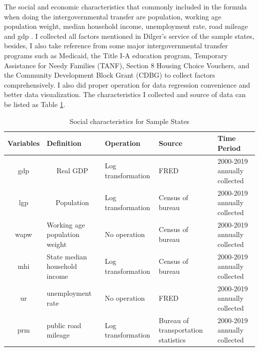 The social and economic characteristics that commonly included in the formula when doing the intergovernmental transfer are population, working age population weight, median household income, unemployment rate, road mileage and gdp \cite{dilger2015federal}. I collected all factors mentioned in Dilger's service\cite{dilger2015federal} of the sample states, besides, I also take reference from some major intergovernmental transfer programs such as Medicaid, the Title I-A education program, Temporary Assistance for Needy Families (TANF), Section 8 Housing Choice Vouchers, and the Community Development Block Grant (CDBG) to collect factors comprehensively. I also did proper operation for data regression convenience and better data visualization. The characteristics I collected and source of data can be listed as Table \ref*{Table 2.4}.

\begin{table}[H]
  \centering
  \caption{Social characteristics for Sample States}
  \begin{tabular}{cp{6.43em}p{9.285em}p{5.855em}p{5.355em}}
    \toprule
    \multicolumn{1}{p{4em}}{Variables } & Definition                      & Operation          & Source                              & Time Period                  \\
    \midrule
    gdp                                 & \multicolumn{1}{c}{Real GDP}    & Log transformation & FRED                                & 2000-2019 annually collected \\
    \midrule
    lgp                                 & \multicolumn{1}{c}{Population } & Log transformation & Census of bureau                    & 2000-2019 annually collected \\
    \midrule
    wapw                                & Working age population weight   & No operation       & Census of bureau                    & 2000-2019 annually collected \\
    \midrule
    mhi                                 & State median household income   & Log transformation & Census of bureau                    & 2000-2019 annually collected \\
    \midrule
    ur                                  & unemployment rate               & No operation       & FRED                                & 2000-2019 annually collected \\
    \midrule
    prm                                 & public road mileage             & Log transformation & Bureau of transportation statistics & 2000-2019 annually collected \\
    \bottomrule
  \end{tabular}%
  \label{Table 2.4}%
\end{table}%


